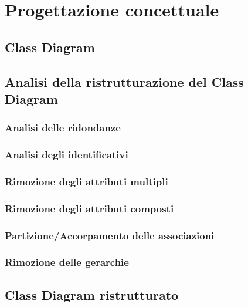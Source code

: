 \chapter{Progettazione concettuale}
    \section{Class Diagram}
        
    \section{Analisi della ristrutturazione del Class Diagram}
        
        \subsection{Analisi delle ridondanze}
            
        \subsection{Analisi degli identificativi}
            
        \subsection{Rimozione degli attributi multipli}
            
        \subsection{Rimozione degli attributi composti}
            
        \subsection{Partizione/Accorpamento delle associazioni}
            
        \subsection{Rimozione delle gerarchie}
    
    \section{Class Diagram ristrutturato}
  
